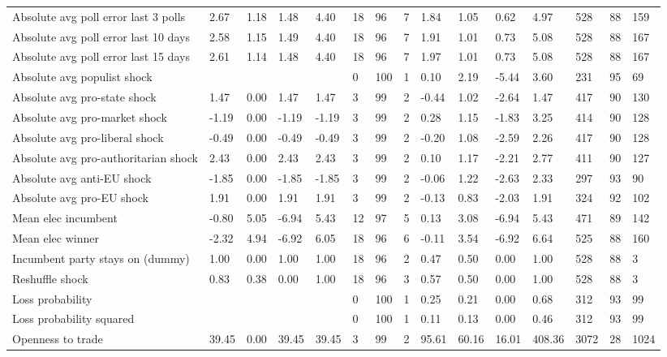 \begin{longtable}{lllllllllllllll}
Absolute avg poll error last 3 polls & 2.67 & 1.18 & 1.48 & 4.40 & 18 & 96 & 7 & 1.84 & 1.05 & 0.62 & 4.97 & 528 & 88 & 159\\
Absolute avg poll error last 10 days & 2.58 & 1.15 & 1.49 & 4.40 & 18 & 96 & 7 & 1.91 & 1.01 & 0.73 & 5.08 & 528 & 88 & 167\\
Absolute avg poll error last 15 days & 2.61 & 1.14 & 1.48 & 4.40 & 18 & 96 & 7 & 1.97 & 1.01 & 0.73 & 5.08 & 528 & 88 & 167\\
Absolute avg populist shock &  &  &  &  & 0 & 100 & 1 & 0.10 & 2.19 & -5.44 & 3.60 & 231 & 95 & 69\\
\addlinespace
Absolute avg pro-state shock & 1.47 & 0.00 & 1.47 & 1.47 & 3 & 99 & 2 & -0.44 & 1.02 & -2.64 & 1.47 & 417 & 90 & 130\\
Absolute avg pro-market shock & -1.19 & 0.00 & -1.19 & -1.19 & 3 & 99 & 2 & 0.28 & 1.15 & -1.83 & 3.25 & 414 & 90 & 128\\
Absolute avg pro-liberal shock & -0.49 & 0.00 & -0.49 & -0.49 & 3 & 99 & 2 & -0.20 & 1.08 & -2.59 & 2.26 & 417 & 90 & 128\\
Absolute avg pro-authoritarian shock & 2.43 & 0.00 & 2.43 & 2.43 & 3 & 99 & 2 & 0.10 & 1.17 & -2.21 & 2.77 & 411 & 90 & 127\\
Absolute avg anti-EU shock & -1.85 & 0.00 & -1.85 & -1.85 & 3 & 99 & 2 & -0.06 & 1.22 & -2.63 & 2.33 & 297 & 93 & 90\\
\addlinespace
Absolute avg pro-EU shock & 1.91 & 0.00 & 1.91 & 1.91 & 3 & 99 & 2 & -0.13 & 0.83 & -2.03 & 1.91 & 324 & 92 & 102\\
Mean elec incumbent & -0.80 & 5.05 & -6.94 & 5.43 & 12 & 97 & 5 & 0.13 & 3.08 & -6.94 & 5.43 & 471 & 89 & 142\\
Mean elec winner & -2.32 & 4.94 & -6.92 & 6.05 & 18 & 96 & 6 & -0.11 & 3.54 & -6.92 & 6.64 & 525 & 88 & 160\\
Incumbent party stays on (dummy) & 1.00 & 0.00 & 1.00 & 1.00 & 18 & 96 & 2 & 0.47 & 0.50 & 0.00 & 1.00 & 528 & 88 & 3\\
Reshuffle shock & 0.83 & 0.38 & 0.00 & 1.00 & 18 & 96 & 3 & 0.57 & 0.50 & 0.00 & 1.00 & 528 & 88 & 3\\
\addlinespace
Loss probability &  &  &  &  & 0 & 100 & 1 & 0.25 & 0.21 & 0.00 & 0.68 & 312 & 93 & 99\\
Loss probability squared &  &  &  &  & 0 & 100 & 1 & 0.11 & 0.13 & 0.00 & 0.46 & 312 & 93 & 99\\
Openness to trade & 39.45 & 0.00 & 39.45 & 39.45 & 3 & 99 & 2 & 95.61 & 60.16 & 16.01 & 408.36 & 3072 & 28 & 1024\\

\end{longtable}
